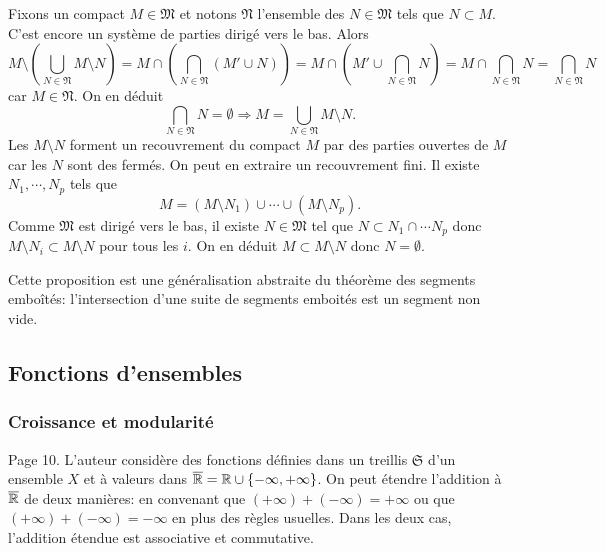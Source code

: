 \begin{demo}
Fixons un compact $M\in \mathfrak{M}$ et notons $\mathfrak{N}$ l'ensemble des $N\in \mathfrak{M}$ tels que $N \subset M$. C'est encore un système de parties dirigé vers le bas. Alors
\begin{displaymath}
 M \setminus \left( \bigcup_{N \in \mathfrak{N}} M\setminus N\right)
 =  M \cap \left( \bigcap_{N \in \mathfrak{N}} (M' \cup N)\right)
 =  M \cap \left( M' \cup \bigcap_{N \in \mathfrak{N}}  N\right)
 =  M \cap  \bigcap_{N \in \mathfrak{N}}N
 = \bigcap_{N \in \mathfrak{N}}N
\end{displaymath}
car $M \in \mathfrak{N}$. On en déduit
\begin{displaymath}
 \bigcap_{N \in \mathfrak{N}}N = \emptyset \Rightarrow M = \bigcup_{N \in \mathfrak{N}} M\setminus N.
\end{displaymath}
Les $M\setminus N$ forment un recouvrement du compact $M$ par des parties ouvertes de $M$ car les $N$ sont des fermés. On peut en extraire un recouvrement fini. Il existe $N_1, \cdots, N_p$ tels que
\begin{displaymath}
 M = (M\setminus N_1) \cup \cdots \cup (M\setminus N_p).
\end{displaymath}
Comme $\mathfrak{M}$ est dirigé vers le bas, il existe $N \in \mathfrak{M}$ tel que $N \subset N_1 \cap \cdots N_p$ donc $M \setminus N_i \subset M \setminus N$ pour tous les $i$. On en déduit $M \subset M \setminus N$ donc $N = \emptyset$.
\end{demo}
Cette proposition est une généralisation abstraite du théorème des segments emboîtés: l'intersection d'une suite de segments emboités est un segment non vide.

\subsection{Fonctions d'ensembles}\label{FoncEns}
\subsubsection{Croissance et modularité}
Page 10. L'auteur considère des fonctions définies dans un treillis $\mathfrak{S}$ d'un ensemble $X$ et à valeurs dans $\overline{\mathbb{R}}= \mathbb{R} \cup\{- \infty, + \infty\} $. On peut étendre l'addition à $\overline{\mathbb{R}}$ de deux manières: en convenant que $(+ \infty) + (-\infty) = + \infty$ ou que $(+ \infty) + (-\infty) = - \infty$ en plus des règles usuelles. Dans les deux cas, l'addition étendue est associative et commutative.

